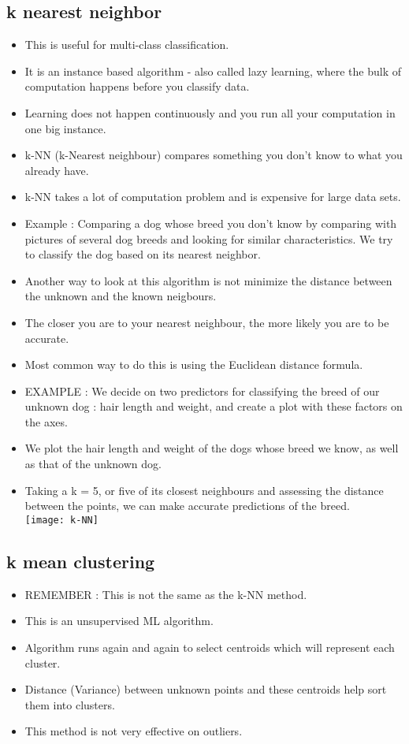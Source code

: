 \documentclass[11pt, oneside]{article}   	%
\begin{document}
\subsection{k nearest neighbor}
\begin{itemize}
\item This is useful for multi-class classification.
\item It is an instance based algorithm - also called lazy learning, where the bulk of computation happens before you classify data.
\item Learning does not happen continuously and you run all your computation in one big instance.
\item k-NN (k-Nearest neighbour) compares something you don't know to what you already have.
\item k-NN takes a lot of computation problem and is expensive for large data sets.
\item Example : Comparing a dog whose breed you don't know by comparing with pictures of several dog breeds and looking for similar characteristics. We try to classify the dog based on its nearest neighbor.
\item Another way to look at this algorithm is not minimize the distance between the unknown and the known neigbours.
\item The closer you are to your nearest neighbour, the more likely you are to be accurate. 
\item Most common way to do this is using the Euclidean distance formula.
\item EXAMPLE : We decide on two predictors for classifying the breed of our unknown dog : hair length and weight, and create a plot with these factors on the axes.
\item We plot the hair length and weight of the dogs whose breed we know, as well as that of the unknown dog.
\item Taking a k = 5, or five of its closest neighbours and assessing the distance between the points, we can make accurate predictions of the breed.
\bigskip \\
\texttt{[image: k-NN]}
\bigskip \\
\end{itemize}
\subsection{k mean clustering}
\begin{itemize}
\item REMEMBER : This is not the same as the k-NN method.
\item This is an unsupervised ML algorithm.
\item Algorithm runs again and again to select centroids which will represent each cluster.
\item Distance (Variance) between unknown points and these centroids help sort them into clusters.
\item This method is not very effective on outliers.
\end{itemize}
\end{document}
